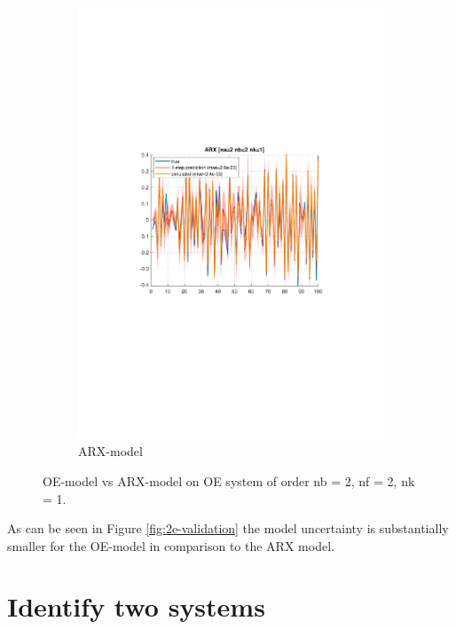 \documentclass[]{article}
\begin{document}
\begin{figure}[ht]
\begin{subfigure}{.49\textwidth}
	\includegraphics[trim= 10cm 8cm 10cm 8cm, scale=0.4]{figures/2e-ARX-horizon_1.pdf}
	\caption{ARX-model}
	\label{fig:2e-ARX-horizon_1}
\end{subfigure}
\caption{OE-model vs ARX-model on OE system of order nb = 2, nf = 2, nk = 1.}
\label{fig:2e-validation<}
\end{figure}
As can be seen in Figure \ref{fig:2e-validation} the model uncertainty is substantially smaller for the OE-model in comparison to the ARX model.

\section{Identify two systems}
\end{document}
